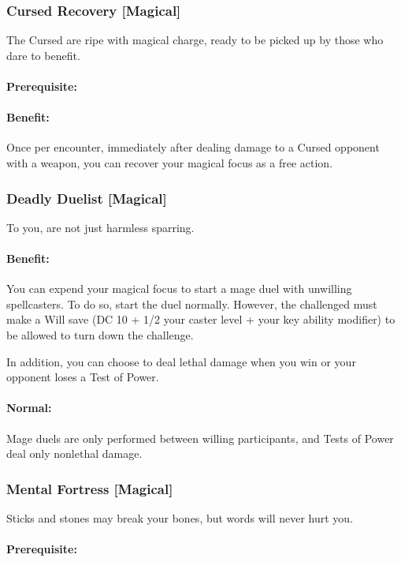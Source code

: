 \subsubsection[Cursed Recovery]{Cursed Recovery [Magical]}
\label{Feat:CursedRecovery}
The Cursed are ripe with magical charge, ready to be picked up by those who dare to benefit.
\paragraph{Prerequisite:} 
\paragraph{Benefit:} Once per encounter, immediately after dealing damage to a Cursed opponent with a weapon, you can recover your magical focus as a free action.

\subsubsection[Deadly Duelist]{Deadly Duelist [Magical]}
\label{Feat:DeadlyDuelist}
To you,  are not just harmless sparring.

\paragraph{Benefit:} You can expend your magical focus to start a mage duel with unwilling spellcasters. To do so, start the duel normally. However, the challenged must make a Will save (DC 10 + 1/2 your caster level + your key ability modifier) to be allowed to turn down the challenge.

In addition, you can choose to deal lethal damage when you win or your opponent loses a Test of Power.
\paragraph{Normal:} Mage duels are only performed between willing participants, and Tests of Power deal only nonlethal damage.

\subsubsection[Mental Fortress]{Mental Fortress [Magical]}
\label{Feat:MentalFortress}
Sticks and stones may break your bones, but words will never hurt you.
\paragraph{Prerequisite:} 
